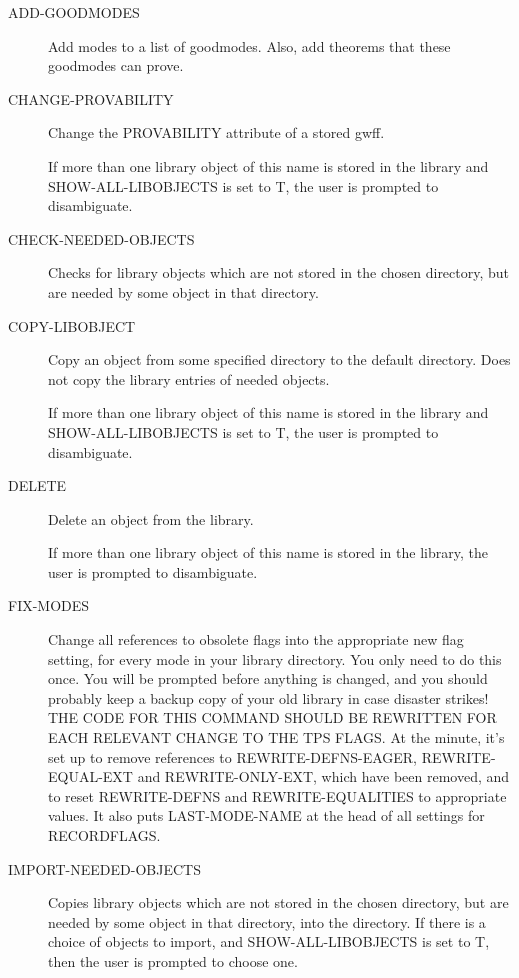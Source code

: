\begin{description} 
\item[ADD-GOODMODES]  
Add modes to a list of goodmodes.  Also, add theorems that these goodmodes can prove.

\item[CHANGE-PROVABILITY]  
Change the PROVABILITY attribute of a stored gwff.

If more than one library object of this name is stored in
the library and SHOW-ALL-LIBOBJECTS is set to T,
the user is prompted to disambiguate.

\item[CHECK-NEEDED-OBJECTS]  
Checks for library objects which are not stored
in the chosen directory, but are needed by some object in
that directory.

\item[COPY-LIBOBJECT]  
Copy an object from some specified directory to the default directory.
Does not copy the library entries of needed objects.

If more than one library object of this name is stored in
the library and SHOW-ALL-LIBOBJECTS is set to T,
the user is prompted to disambiguate.

\item[DELETE]  
Delete an object from the library.

If more than one library object of this name is stored in
the library, the user is prompted to disambiguate.

\item[FIX-MODES]  
Change all references to obsolete flags into the 
appropriate new flag setting, for every mode in your library
directory. You only need to do this once.
You will be prompted before anything is changed, and
you should probably keep a backup copy of your old library in
case disaster strikes!
THE CODE FOR THIS COMMAND SHOULD BE REWRITTEN FOR EACH 
RELEVANT CHANGE TO THE TPS FLAGS.
At the minute, it's set up to remove references to 
REWRITE-DEFNS-EAGER, REWRITE-EQUAL-EXT and REWRITE-ONLY-EXT,
which have been removed, and to reset REWRITE-DEFNS
and REWRITE-EQUALITIES to appropriate values.
It also puts LAST-MODE-NAME at the head of all settings
for RECORDFLAGS.

\item[IMPORT-NEEDED-OBJECTS]  
Copies library objects which are not stored
in the chosen directory, but are needed by some object in
that directory, into the directory.  If there is a choice
of objects to import, and SHOW-ALL-LIBOBJECTS is set to T,
then the user is prompted to choose one.


\end{description}
